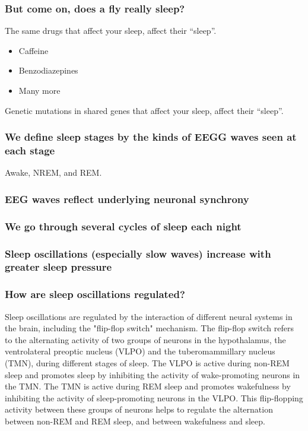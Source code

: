 \begin{itemize}
\begin{itemize}
\subsubsection{But come on, does a fly really sleep?
}
The same drugs that affect your sleep, affect their
“sleep”.
\begin{itemize}
    \item  Caffeine
\item Benzodiazepines
\item Many more
\end{itemize}
Genetic mutations in shared genes that affect your
sleep, affect their “sleep”.

\subsubsection{We define sleep stages by the kinds of EEGG waves seen at each stage}
Awake, NREM, and REM.

\subsubsection{EEG waves reflect underlying neuronal synchrony}

\subsubsection{We go through several cycles of sleep each night}
\subsubsection{Sleep oscillations (especially slow waves) increase with greater sleep pressure}

\subsubsection{How are sleep oscillations regulated?}
Sleep oscillations are regulated by the interaction of different neural systems in the brain, including the "flip-flop switch" mechanism. The flip-flop switch refers to the alternating activity of two groups of neurons in the hypothalamus, the ventrolateral preoptic nucleus (VLPO) and the tuberomammillary nucleus (TMN), during different stages of sleep. The VLPO is active during non-REM sleep and promotes sleep by inhibiting the activity of wake-promoting neurons in the TMN. The TMN is active during REM sleep and promotes wakefulness by inhibiting the activity of sleep-promoting neurons in the VLPO. This flip-flopping activity between these groups of neurons helps to regulate the alternation between non-REM and REM sleep, and between wakefulness and sleep.

\end{itemize}
\end{itemize}
